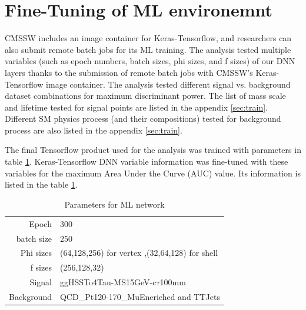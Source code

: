 
\section{Fine-Tuning of ML environemnt}
CMSSW includes an image container for Keras-Tensorflow, and researchers can also submit remote batch jobs for its ML training.
The analysis tested multiple variables (such as epoch numbers, batch sizes, phi sizes, and f sizes) of our DNN layers thanks to the submission of remote batch jobs with CMSSW's Keras-Tensorflow image container.
The analysis tested different signal vs. background dataset combinations for maximum discriminant power.
The list of mass scale and lifetime tested for signal points are listed in the appendix \ref{sec:train}.
Different SM physics process (and their compositions) tested for background process are also listed in the appendix \ref{sec:train}.

The final Tensorflow product used for the analysis was trained with parameters in table \ref{tab:ROIParam}.
Keras-Tensorflow DNN variable information was fine-tuned with these variables for the maximum Area Under the Curve (AUC) value.
Its information is listed in the table \ref{tab:ROIParam}.
\begin{table}[htb]
\caption{Parameters for ML network}
\begin{center}
\begin{tabular}{r|l}\hline
Epoch & 300 \\
batch size & 250 \\
Phi sizes & (64,128,256) for vertex ,(32,64,128) for shell \\
f sizes & (256,128,32) \\
Signal & ggHSSTo4Tau-MS15GeV-c$\tau$100mm  \\
Background & QCD\_Pt120-170\_MuEneriched and TTJets \\
 \hline
 \hline
\end{tabular}
\label{tab:ROIParam}
\end{center}
\end{table}


